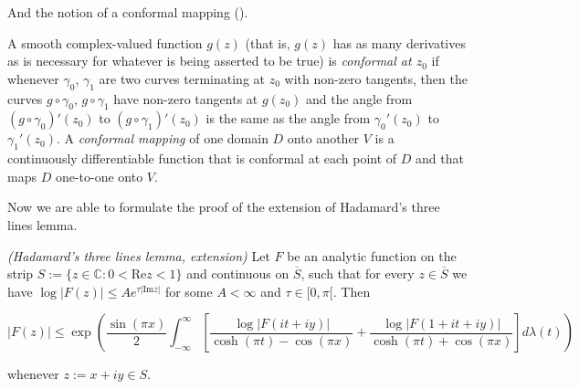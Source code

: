 \vspace{2mm}

And the notion of a conformal mapping (\cite[59]{gamelin:complex_analysis:2001}).

\vspace{2mm}

\begin{mdframed}
	\begin{definition}
		A smooth complex-valued function $g(z)$ (that is, $g(z)$ has as many derivatives as is necessary for whatever is being asserted to be true) is \emph{conformal at $z_0$} if whenever $\gamma_0$, $\gamma_1$ are two curves terminating at $z_0$ with non-zero tangents, then the curves $g \circ \gamma_0$, $g \circ \gamma_1$ have non-zero tangents at $g(z_0)$ and the angle from $\left( g \circ \gamma_0 \right)'(z_0)$ to $\left( g \circ \gamma_1 \right)'(z_0)$ is the same as the angle from $\gamma_0'(z_0)$ to $\gamma_1'(z_0)$. A \emph{conformal mapping} of one domain $D$ onto another $V$ is a continuously differentiable function that is conformal at each point of $D$ and that maps $D$ one-to-one onto $V$.
	\end{definition}
\end{mdframed}

\vspace{2mm}

Now we are able to formulate the proof of the extension of Hadamard's three lines lemma.

\vspace{2mm}

\begin{mdframed}
	\begin{lemma}\emph{(Hadamard's three lines lemma, extension)}
		Let $F$ be an analytic function on the strip $S := \{z \in \mathbb{C}: 0 < \mathrm{Re}z < 1\}$ and continuous on $\overline{S}$, such that for every $z \in \overline{S}$ we have $\log \vert F(z)\vert \leqslant A e^{\tau \vert \mathrm{Im}z \vert}$ for some $A < \infty$ and $\tau \in [0,\pi[$. Then

			\begin{equation*}
				\vert F(z) \vert \leqslant \exp\left( \frac{\sin(\pi x)}{2} \int_{-\infty}^\infty \left[ \frac{\log \vert F(it + iy)\vert}{\cosh(\pi t) - \cos(\pi x)} + \frac{\log \vert F(1 + it + iy)\vert}{\cosh(\pi t) + \cos(\pi x)} \right] d\lambda(t)\right)
			\end{equation*}

			whenever $z := x + iy \in S$.
	\end{lemma}
\end{mdframed}

